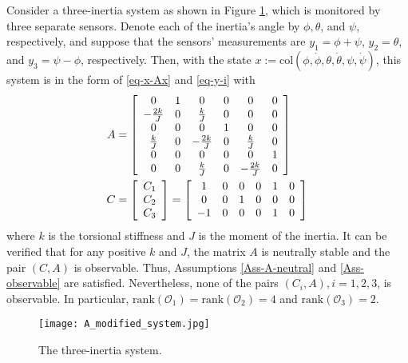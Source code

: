 \documentclass[twocolumn]{autart}
\begin{document}
Consider a three-inertia system as shown in Figure \ref{Fig-System},
which is monitored by three separate sensors.
Denote each of the inertia's angle by $\phi, \theta$, and $\psi$, respectively,
and suppose that the sensors' measurements are
$y_{1}=\phi+\psi$, $y_{2}=\theta$, and $y_{3}=\psi-\phi$, respectively.
Then, with the state $x:=\text{col}\left(\phi, \dot{\phi}, \theta, \dot{\theta}, \psi, \dot{\psi}\right)$,
this system is in the form of \eqref{eq-x-Ax} and \eqref{eq-y-i} with
\begin{align*}
    A &= \left[
           \begin{array}{cccccc}
             0 & 1 & 0 & 0 & 0 & 0 \\
             -\frac{2k}{J} & 0 & \frac{k}{J} & 0 & 0 & 0 \\
             0 & 0 & 0 & 1 & 0 & 0 \\
             \frac{k}{J} & 0 & -\frac{2k}{J} & 0 & \frac{k}{J} & 0 \\
             0 & 0 & 0 & 0 & 0 & 1 \\
             0 & 0 & \frac{k}{J} & 0 & -\frac{2k}{J} & 0 \\
           \end{array}
         \right] \notag\\
    C&=\left[
      \begin{array}{c}
        C_{1} \\
        C_{2} \\
        C_{3} \\
      \end{array}
    \right]=\left[
              \begin{array}{cccccc}
                1 & 0 & 0 & 0 & 1 & 0 \\
                0 & 0 & 1 & 0 & 0 & 0 \\
                -1 & 0 & 0 & 0 & 1 & 0 \\
              \end{array}
            \right]
\end{align*}
where $k$ is the torsional stiffness and $J$ is the moment of the inertia.
It can be verified that for any positive $k$ and $J$,
the matrix $A$ is neutrally stable and the pair $(C,A)$ is observable.
Thus, Assumptions \ref{Ass-A-neutral} and \ref{Ass-observable} are satisfied.
Nevertheless, none of the pairs $(C_{i},A), i=1,2,3$, is observable.
In particular, $\text{rank}(\mathcal{O}_{1})=\text{rank}(\mathcal{O}_{2})=4$
and $\text{rank}(\mathcal{O}_{3})=2$.


\begin{figure}
\centering
  \texttt{[image: A\_modified\_system.jpg]}\\
  \caption{The three-inertia system.}\label{Fig-System}
\end{figure}
\end{document}
